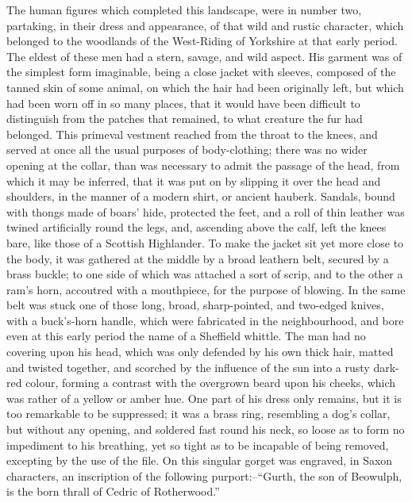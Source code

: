 The human figures which completed this landscape, were in number two,
partaking, in their dress and appearance, of that wild and rustic
character, which belonged to the woodlands of the West-Riding of
Yorkshire at that early period. The eldest of these men had a stern,
savage, and wild aspect. His garment was of the simplest form
imaginable, being a close jacket with sleeves, composed of the tanned
skin of some animal, on which the hair had been originally left, but
which had been worn off in so many places, that it would have been
difficult to distinguish from the patches that remained, to what
creature the fur had belonged. This primeval vestment reached from the
throat to the knees, and served at once all the usual purposes of
body-clothing; there was no wider opening at the collar, than was
necessary to admit the passage of the head, from which it may be
inferred, that it was put on by slipping it over the head and shoulders,
in the manner of a modern shirt, or ancient hauberk. Sandals, bound with
thongs made of boars' hide, protected the feet, and a roll of thin
leather was twined artificially round the legs, and, ascending above the
calf, left the knees bare, like those of a Scottish Highlander. To make
the jacket sit yet more close to the body, it was gathered at the middle
by a broad leathern belt, secured by a brass buckle; to one side of
which was attached a sort of scrip, and to the other a ram's horn,
accoutred with a mouthpiece, for the purpose of blowing. In the same
belt was stuck one of those long, broad, sharp-pointed, and two-edged
knives, with a buck's-horn handle, which were fabricated in the
neighbourhood, and bore even at this early period the name of a
Sheffield whittle. The man had no covering upon his head, which was only
defended by his own thick hair, matted and twisted together, and
scorched by the influence of the sun into a rusty dark-red colour,
forming a contrast with the overgrown beard upon his cheeks, which was
rather of a yellow or amber hue. One part of his dress only remains, but
it is too remarkable to be suppressed; it was a brass ring, resembling a
dog's collar, but without any opening, and soldered fast round his neck,
so loose as to form no impediment to his breathing, yet so tight as to
be incapable of being removed, excepting by the use of the file. On this
singular gorget was engraved, in Saxon characters, an inscription of the
following purport:--``Gurth, the son of Beowulph, is the born thrall of
Cedric of Rotherwood.''

